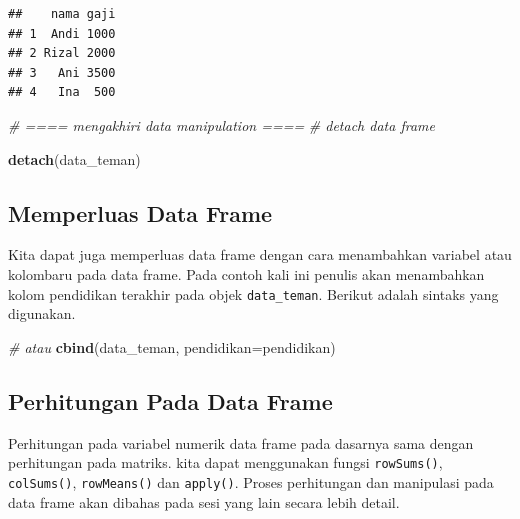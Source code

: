 \documentclass[]{book}
\newenvironment{Shaded}{\begin{snugshade}}{\end{snugshade}}
\newcommand{\KeywordTok}[1]{\textcolor[rgb]{0.13,0.29,0.53}{\textbf{#1}}}
\newcommand{\DataTypeTok}[1]{\textcolor[rgb]{0.13,0.29,0.53}{#1}}
\newcommand{\StringTok}[1]{\textcolor[rgb]{0.31,0.60,0.02}{#1}}
\newcommand{\CommentTok}[1]{\textcolor[rgb]{0.56,0.35,0.01}{\textit{#1}}}
\newcommand{\OperatorTok}[1]{\textcolor[rgb]{0.81,0.36,0.00}{\textbf{#1}}}
\newcommand{\NormalTok}[1]{#1}
\begin{document}
\begin{verbatim}
##    nama gaji
## 1  Andi 1000
## 2 Rizal 2000
## 3   Ani 3500
## 4   Ina  500
\end{verbatim}

\begin{Shaded}
\begin{Highlighting}[]
\CommentTok{# ==== mengakhiri data manipulation ====}
\CommentTok{# detach data frame}

\KeywordTok{detach}\NormalTok{(data_teman)}
\end{Highlighting}
\end{Shaded}

\subsection{Memperluas Data Frame}\label{memperluas-data-frame}

Kita dapat juga memperluas data frame dengan cara menambahkan variabel
atau kolombaru pada data frame. Pada contoh kali ini penulis akan
menambahkan kolom pendidikan terakhir pada objek \texttt{data\_teman}.
Berikut adalah sintaks yang digunakan.

\begin{Shaded}
\end{Shaded}

\begin{Shaded}
\begin{Highlighting}[]
\CommentTok{# atau}
\KeywordTok{cbind}\NormalTok{(data_teman, }\DataTypeTok{pendidikan=}\NormalTok{pendidikan)}
\end{Highlighting}
\end{Shaded}

\subsection{Perhitungan Pada Data
Frame}\label{perhitungan-pada-data-frame}

Perhitungan pada variabel numerik data frame pada dasarnya sama dengan
perhitungan pada matriks. kita dapat menggunakan fungsi
\texttt{rowSums()}, \texttt{colSums()}, \texttt{rowMeans()} dan
\texttt{apply()}. Proses perhitungan dan manipulasi pada data frame akan
dibahas pada sesi yang lain secara lebih detail.
\end{document}
